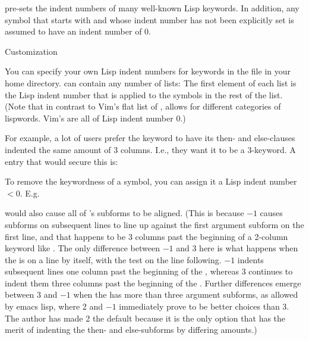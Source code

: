 
 pre-sets the indent numbers of many well-known
Lisp keywords.  In addition, any symbol that starts with  and whose
indent number has not
been explicitly set is assumed to 
have an indent number of 0.

\beginsection Customization 

You can specify your own Lisp indent numbers for keywords in the file
 in your home directory.   can contain any number of
lists: The first element of each list is the Lisp indent number that is
applied to the symbols in the rest of the list.  (Note that in contrast
to Vim's flat list of , 
allows for different categories of lispwords.  Vim's  are
all of Lisp indent number 0.)

For example, a lot of users prefer the keyword  to have its then-
and else-clauses indented the same amount of 3 columns.  I.e.,
they want it to be a 3-keyword.  A  entry that would
secure this is:


To remove the keywordness of a symbol, you can assign it a Lisp indent
number $< 0$.  E.g.

would also cause all of 's subforms to be aligned.  (This is because
$-1$ causes subforms on subsequent lines to line up against the first
argument subform on the first line, and that happens to be 3 columns
past the beginning of a 2-column keyword like .  The only difference
between $-1$ and 3 here is what happens when the  is on a line by
itself, with the test on the line following.  $-1$ indents subsequent
lines one column past the beginning of the , whereas 3 continues to
indent them three columns past the beginning of the .  Further
differences emerge between 3 and $-1$ when the  has more than three
argument subforms, as allowed by emacs lisp, where 2 and $-1$ immediately
prove to be better choices than 3.  The author has made 2 the default
because it is the only option that has the merit of indenting the then-
and else-subforms by differing amounts.)

\bye
